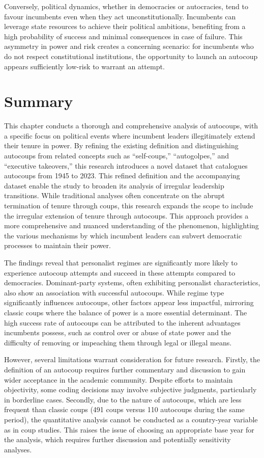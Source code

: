 \documentclass[
  12pt,
]{report}
\begin{document}
Conversely, political dynamics, whether in democracies or autocracies,
tend to favour incumbents even when they act unconstitutionally.
Incumbents can leverage state resources to achieve their political
ambitions, benefiting from a high probability of success and minimal
consequences in case of failure. This asymmetry in power and risk
creates a concerning scenario: for incumbents who do not respect
constitutional institutions, the opportunity to launch an autocoup
appears sufficiently low-risk to warrant an attempt.

\section{Summary}\label{summary-1}

This chapter conducts a thorough and comprehensive analysis of
autocoups, with a specific focus on political events where incumbent
leaders illegitimately extend their tenure in power. By refining the
existing definition and distinguishing autocoups from related concepts
such as ``self-coups,'' ``autogolpes,'' and ``executive takeovers,''
this research introduces a novel dataset that catalogues autocoups from
1945 to 2023. This refined definition and the accompanying dataset
enable the study to broaden its analysis of irregular leadership
transitions. While traditional analyses often concentrate on the abrupt
termination of tenure through coups, this research expands the scope to
include the irregular extension of tenure through autocoups. This
approach provides a more comprehensive and nuanced understanding of the
phenomenon, highlighting the various mechanisms by which incumbent
leaders can subvert democratic processes to maintain their power.

The findings reveal that personalist regimes are significantly more
likely to experience autocoup attempts and succeed in these attempts
compared to democracies. Dominant-party systems, often exhibiting
personalist characteristics, also show an association with successful
autocoups. While regime type significantly influences autocoups, other
factors appear less impactful, mirroring classic coups where the balance
of power is a more essential determinant. The high success rate of
autocoups can be attributed to the inherent advantages incumbents
possess, such as control over or abuse of state power and the difficulty
of removing or impeaching them through legal or illegal means.

However, several limitations warrant consideration for future research.
Firstly, the definition of an autocoup requires further commentary and
discussion to gain wider acceptance in the academic community. Despite
efforts to maintain objectivity, some coding decisions may involve
subjective judgments, particularly in borderline cases. Secondly, due to
the nature of autocoups, which are less frequent than classic coups (491
coups versus 110 autocoups during the same period), the quantitative
analysis cannot be conducted as a country-year variable as in coup
studies. This raises the issue of choosing an appropriate base year for
the analysis, which requires further discussion and potentially
sensitivity analyses.
\end{document}
